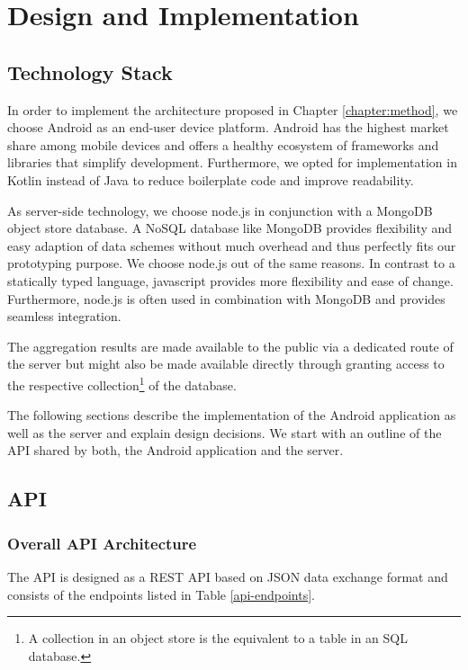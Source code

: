 \chapter{Design and Implementation}\label{chapter:design}

\section{Technology Stack}
In order to implement the architecture proposed in Chapter \ref{chapter:method}, we choose Android as an end-user device platform. Android has the highest market share among mobile devices \cite{android-market-share} and offers a healthy ecosystem of frameworks and libraries that simplify development. Furthermore, we opted for implementation in Kotlin instead of Java to reduce boilerplate code and improve readability.

As server-side technology, we choose node.js in conjunction with a MongoDB object store database. A NoSQL database like MongoDB provides flexibility and easy adaption of data schemes without much overhead and thus perfectly fits our prototyping purpose. We choose node.js out of the same reasons. In contrast to a statically typed language, javascript provides more flexibility and ease of change. Furthermore, node.js is often used in combination with MongoDB and provides seamless integration.

The aggregation results are made available to the public via a dedicated route of the server but might also be made available directly through granting access to the respective collection\footnote{A collection in an object store is the equivalent to a table in an SQL database.} of the database.

The following sections describe the implementation of the Android application as well as the server and explain design decisions. We start with an outline of the API shared by both, the Android application and the server.\\

\section{API}\label{api}
\subsection{Overall API Architecture}
The API is designed as a REST API based on JSON data exchange format and consists of the endpoints listed in Table \ref{api-endpoints}.

